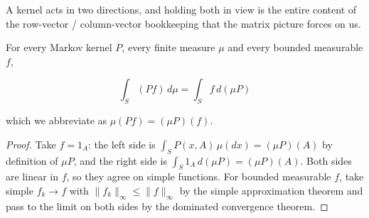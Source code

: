 	A kernel acts in two directions, and holding both in view is the entire content of the row-vector / column-vector bookkeeping that the matrix picture forces on us.

	\begin{lemma}
		\label{thm:adjointness-of-the-two-kernel-actions}
		For every Markov kernel $P$, every finite measure $\mu$ and every bounded measurable $f$,

			\begin{equation}
				\int_S (P f) \, d\mu = \int_S f \, d(\mu P)
			\end{equation}

		which we abbreviate as $\mu(P f) = (\mu P)(f)$.
	\end{lemma}
	\begin{proof}
		Take $f = 1_A$: the left side is $\int_S P(x, A) \, \mu(dx) = (\mu P)(A)$ by definition of $\mu P$, and the right side is $\int_S 1_A \, d(\mu P) = (\mu P)(A)$. Both sides are linear in $f$, so they agree on simple functions. For bounded measurable $f$, take simple $f_k \rightarrow f$ with $\|f_k\|_\infty \leq \|f\|_\infty$ by the simple approximation theorem and pass to the limit on both sides by the dominated convergence theorem.
	\end{proof}

